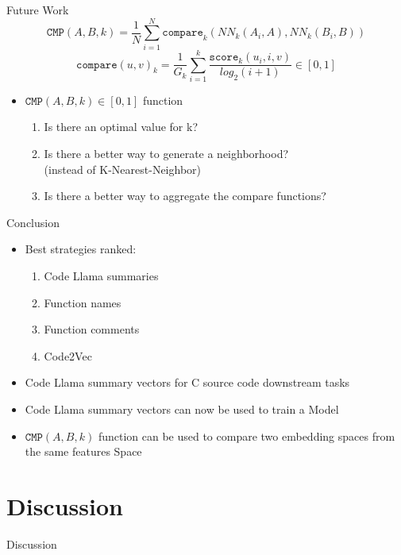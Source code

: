 \documentclass[aspectratio=1610,12pt]{beamer}
\begin{document}
\begin{frame}{Future Work}
    \[
    \texttt{CMP}(A,B,k) = \frac{1}{N}\sum_{i = 1}^{N}
      \texttt{compare}_k(NN_k(A_i,A),NN_k(B_i, B))
    \]
    \[
    \texttt{compare}(u,v)_k = 
      \frac{1}{G_k} \sum^{k}_{i=1} 
      \frac{ \texttt{score}_{k}(u_i,i,v)}{log_2(i+1)} 
      \in [0,1]
    \]
  \begin{itemize}
  \item $\texttt{CMP}(A,B,k) \in [0,1] $ function
    \begin{enumerate}
      \item Is there an optimal value for k?
      \item Is there a better way to generate a neighborhood?\\
        (instead of K-Nearest-Neighbor)
      \item Is there a better way to aggregate the compare functions?
    \end{enumerate}
  \end{itemize}
\end{frame}

\begin{frame}{Conclusion}
  \begin{itemize}
    \item Best strategies ranked: 
    \begin{enumerate}
      \item Code Llama summaries
      \item Function names
      \item Function comments
      \item Code2Vec
    \end{enumerate}
    \item Code Llama summary vectors for 
      C source code downstream tasks
    \item Code Llama summary vectors can now 
      be used to train a Model
  \item $\texttt{CMP}(A,B,k)$ function
    can be used to compare two embedding 
    spaces from the same features Space
  \end{itemize}
\end{frame}

\appendix
\section{Discussion}
\begin{frame}{Discussion}

\end{frame}
\end{document}
